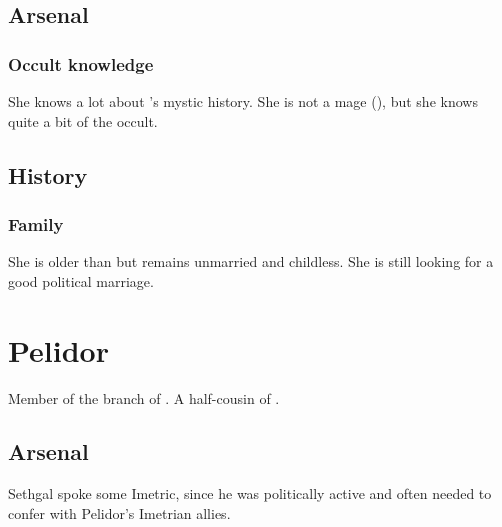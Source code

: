 \subsection{Arsenal}
\subsubsection{Occult knowledge}
She knows a lot about \Malcur's mystic history. 
She is not a mage (), but she knows quite a bit of the occult. 









\subsection{History}
\subsubsection{Family}
She is older than \Tiroco{} but remains unmarried and childless. 
She is still looking for a good political marriage. 















\section[Sethgal Pelidor]{ Pelidor}
Member of the \Malcuric{} branch of . 
A half-cousin of . 









\subsection{Arsenal}
Sethgal spoke some Imetric, since he was politically active and often needed to confer with Pelidor's Imetrian allies. 









